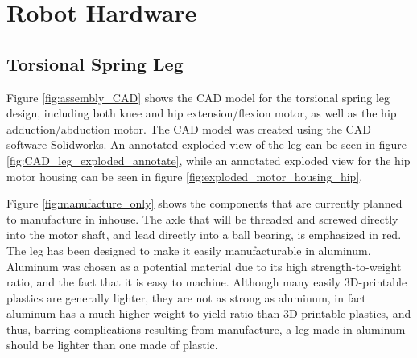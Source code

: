 \section{Robot Hardware}
\label{sec:robot_hardware}

\subsection{Torsional Spring Leg}
\label{sec:torsional_spring_leg}

Figure \ref{fig:assembly_CAD} shows the CAD model for the torsional spring leg design, including both knee and hip extension/flexion motor, as well as the hip adduction/abduction motor. The CAD model was created using the CAD software Solidworks. An annotated exploded view of the leg can be seen in figure \ref{fig:CAD_leg_exploded_annotate}, while an annotated exploded view for the hip motor housing can be seen in figure \ref{fig:exploded_motor_housing_hip}. 

Figure \ref{fig:manufacture_only} shows the components that are currently planned to manufacture in inhouse. The axle that will be threaded and screwed directly into the motor shaft, and lead directly into a ball bearing, is emphasized in red. The leg has been designed to make it easily manufacturable in aluminum. Aluminum was chosen as a potential material due to its high strength-to-weight ratio, and the fact that it is easy to machine. Although many easily 3D-printable plastics are generally lighter, they are not as strong as aluminum, in fact aluminum has a much higher weight to yield ratio than 3D printable plastics, and thus, barring complications resulting from manufacture, a leg made in aluminum should be lighter than one made of plastic. 

